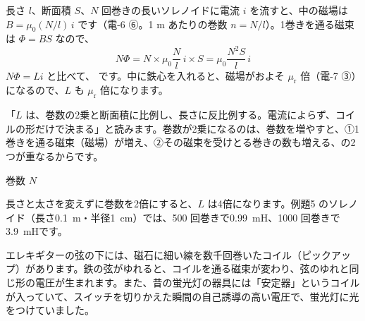 長さ $l$、断面積 $S$、$N$ 回巻きの長いソレノイドに電流 $i$ を流すと、中の磁場は $B=\mu_0(N/l)\,i$ です（電-6 ⑥。1 m あたりの巻数 $n=N/l$）。1巻きを通る磁束は $\Phi=BS$ なので、
\[ N\Phi=N\times\mu_0\frac{N}{l}\,i\times S=\mu_0\frac{N^2S}{l}\,i \]
$N\Phi=Li$ と比べて、
です。中に鉄心を入れると、磁場がおよそ $\mu_{\mathrm r}$ 倍（電-7 ③）になるので、$L$ も $\mu_{\mathrm r}$ 倍になります。

\begin{phyomi}[$L=\mu_0N^2S/l$]
「$L$ は、巻数の2乗と断面積に比例し、長さに反比例する。電流によらず、コイルの形だけで決まる」と読みます。巻数が2乗になるのは、巻数を増やすと、①1巻きを通る磁束（磁場）が増え、②その磁束を受けとる巻きの数も増える、の2つが重なるからです。
\end{phyomi}

\begin{phbaisuru}{巻数 $N$}
\noindent\begin{minipage}[c]{0.45\linewidth}\raggedright
長さと太さを変えずに巻数を2倍にすると、$L$ は4倍になります。例題5 のソレノイド（長さ\qty{0.1}{m}・半径\qty{1}{cm}）では、500 回巻きで\qty{0.99}{mH}、1000 回巻きで\qty{3.9}{mH}です。
\end{minipage}\hfill
\begin{minipage}[c]{0.53\linewidth}\centering
{}
\end{minipage}
\end{phbaisuru}

\begin{phmijika}
エレキギターの弦の下には、磁石に細い線を数千回巻いたコイル（ピックアップ）があります。鉄の弦がゆれると、コイルを通る磁束が変わり、弦のゆれと同じ形の電圧が生まれます。また、昔の蛍光灯の器具には「安定器」というコイルが入っていて、スイッチを切りかえた瞬間の自己誘導の高い電圧で、蛍光灯に光をつけていました。
\end{phmijika}

